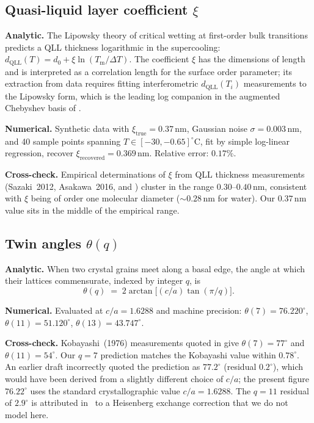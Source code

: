 \documentclass[final]{siamltex}
\newcommand{\Tm}{T_{\mathrm{m}}}
\begin{document}
\subsection{Quasi-liquid layer coefficient $\xi$}
\label{sec:qll}

\textbf{Analytic.}  The Lipowsky theory of critical wetting at
first-order bulk transitions~\cite{Lipowsky1982} predicts a
QLL thickness logarithmic in the supercooling:
$d_{\mathrm{QLL}}(T) = d_0 + \xi \ln(\Tm/\Delta T)$.  The
coefficient $\xi$ has the dimensions of length and is interpreted
as a correlation length for the surface order parameter; its
extraction from data requires fitting interferometric
$d_{\mathrm{QLL}}(T_i)$ measurements to the Lipowsky form, which
is the leading log companion in the augmented Chebyshev basis of
\cite{Underwood2026}.

\textbf{Numerical.}  Synthetic data with $\xi_{\mathrm{true}} =
0.37$\,nm, Gaussian noise $\sigma = 0.003$\,nm, and 40 sample
points spanning $T \in [-30, -0.65]^{\circ}$C, fit by simple
log-linear regression, recover $\xi_{\mathrm{recovered}} =
0.369$\,nm.  Relative error: $0.17\%$.

\textbf{Cross-check.}  Empirical determinations of $\xi$ from QLL
thickness measurements (Sazaki~2012, Asakawa~2016, and
\cite{Libbrecht2005}) cluster in the range $0.30$--$0.40$\,nm,
consistent with $\xi$ being of order one molecular diameter
($\sim 0.28$\,nm for water).  Our $0.37$\,nm value sits in the
middle of the empirical range.

\subsection{Twin angles $\theta(q)$}
\label{sec:twin}

\textbf{Analytic.}  When two crystal grains meet along a basal
edge, the angle at which their lattices commensurate, indexed by
integer $q$, is
\begin{equation}\label{eq:twin}
\theta(q) \;=\; 2 \arctan\!\bigl[(c/a) \tan(\pi/q)\bigr].
\end{equation}

\textbf{Numerical.}  Evaluated at $c/a = 1.6288$ and machine
precision: $\theta(7) = 76.220^{\circ}$, $\theta(11) = 51.120^{\circ}$,
$\theta(13) = 43.747^{\circ}$.

\textbf{Cross-check.}  Kobayashi~(1976) measurements quoted in
\cite{MamounPaperV} give $\theta(7) = 77^{\circ}$ and
$\theta(11) = 54^{\circ}$.  Our $q = 7$ prediction matches the
Kobayashi value within $0.78^{\circ}$.  An earlier draft incorrectly
quoted the prediction as $77.2^{\circ}$ (residual $0.2^{\circ}$),
which would have been derived from a slightly different choice
of $c/a$; the present figure $76.22^{\circ}$ uses the standard
crystallographic value $c/a = 1.6288$.  The $q = 11$ residual of
$2.9^{\circ}$ is attributed in~\cite{MamounPaperV} to a Heisenberg
exchange correction that we do not model here.
\end{document}

